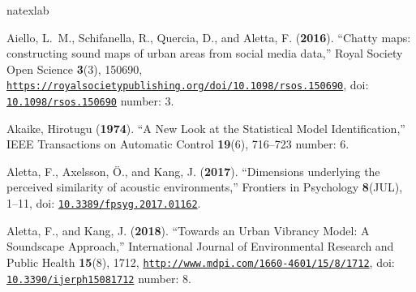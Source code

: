 


% 

\begin{thebibliography}{52}
\def\enquote#1{``#1,''}
\def\plainquote#1{``#1''}
\expandafter\ifx\csname natexlab\endcsname\relax\def\natexlab#1{#1}\fi
\providecommand{\dourl}[1]{\href{http://#1}{\nolinkurl{#1}}}
\providecommand{\bibinfo}[2]{#2}
\providecommand{\noopsort}[1]{}
\providecommand{\switchargs}[2]{#2#1}
  \def\eatspace #1{#1}
\providecommand{\dodoi}[1]{doi: \href{http://dx.doi.org/#1}{\nolinkurl{#1}}}

\bibinfo{author}{Aiello, L.~M.}, \bibinfo{author}{Schifanella, R.},
  \bibinfo{author}{Quercia, D.},  and \bibinfo{author}{Aletta, F.}
  (\textbf{\bibinfo{year}{2016}}). \enquote{\bibinfo{title}{Chatty maps:
  constructing sound maps of urban areas from social media data}}
  \bibinfo{journal}{Royal Society Open Science} \textbf{3}(3),
  \bibinfo{pages}{150690},
  \dourl{https://royalsocietypublishing.org/doi/10.1098/rsos.150690},
  \dodoi{10.1098/rsos.150690} \bibinfo{note}{number: 3}.

\bibinfo{author}{{Akaike, Hirotugu}} (\textbf{\bibinfo{year}{1974}}).
  \enquote{\bibinfo{title}{A {New} {Look} at the {Statistical} {Model}
  {Identification}}} \bibinfo{journal}{IEEE Transactions on Automatic Control}
  \textbf{19}(6), \bibinfo{pages}{716--723} \bibinfo{note}{number: 6}.

\bibinfo{author}{Aletta, F.}, \bibinfo{author}{Axelsson, {\"{O}}.},  and
  \bibinfo{author}{Kang, J.} (\textbf{\bibinfo{year}{2017}}).
  \enquote{\bibinfo{title}{{Dimensions underlying the perceived similarity of
  acoustic environments}}} \bibinfo{journal}{Frontiers in Psychology}
  \textbf{8}(JUL), \bibinfo{pages}{1--11}, \dodoi{10.3389/fpsyg.2017.01162}.

\bibinfo{author}{Aletta, F.},  and \bibinfo{author}{Kang, J.}
  (\textbf{\bibinfo{year}{2018}}). \enquote{\bibinfo{title}{Towards an {Urban}
  {Vibrancy} {Model}: {A} {Soundscape} {Approach}}}
  \bibinfo{journal}{International Journal of Environmental Research and Public
  Health} \textbf{15}(8), \bibinfo{pages}{1712},
  \dourl{http://www.mdpi.com/1660-4601/15/8/1712},
  \dodoi{10.3390/ijerph15081712} \bibinfo{note}{number: 8}.


\end{thebibliography}
